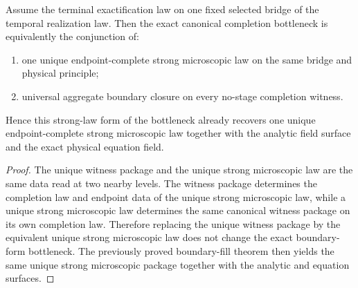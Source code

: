 \begin{theorem}
\label{thm:canonical-completion-bottleneck-iff-canonical-strong-microscopic-law-plus-universal-boundary-fill}
Assume the terminal exactification law on one fixed selected bridge of the
temporal realization law. Then the exact canonical completion bottleneck is
equivalently the conjunction of:
\begin{enumerate}
\item one unique endpoint-complete strong microscopic law on the same bridge
and physical principle;
\item universal aggregate boundary closure on every
      no-stage completion witness.
\end{enumerate}
Hence this strong-law form of the bottleneck already recovers one unique
endpoint-complete strong microscopic law together with the analytic field
surface and the exact physical equation field.
\end{theorem}

\begin{proof}
The unique witness package and the unique strong microscopic law are
the same data read at two nearby levels. The witness package determines the
completion law and endpoint data of the unique strong microscopic law, while a
unique strong microscopic law determines the same canonical witness package on
its own completion law. Therefore replacing the unique witness package by the
equivalent unique strong microscopic law does not change the exact boundary-form
bottleneck. The previously proved boundary-fill theorem then yields the same
unique strong microscopic package together with the analytic and equation
surfaces.
\end{proof}


